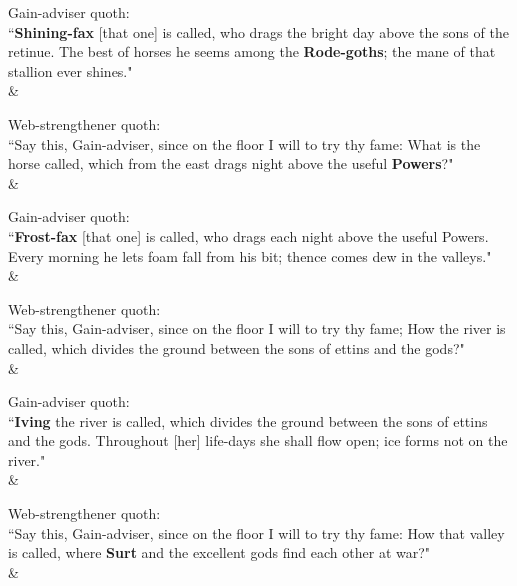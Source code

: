 \begin{Rightside}
\begin{astanza}%
\bv Gain-adviser quoth: \\ “\textbf{Shining-fax} [that one] is called, who drags the bright day above the sons of the retinue. The best of horses he seems among the \textbf{Rode-goths}; the mane of that stallion ever shines." \\
\&\end{astanza}%

\begin{astanza}%
\bv Web-strengthener quoth: \\ “Say this, Gain-adviser, since on the floor I will to try thy fame: What is the horse called, which from the east drags night above the useful \textbf{Powers}?" \\
\&\end{astanza}%

\begin{astanza}%
\bv Gain-adviser quoth: \\ “\textbf{Frost-fax} [that one] is called, who drags each night above the useful Powers. Every morning he lets foam fall from his bit\footnotemark[26]; thence comes dew in the valleys." \\
\&\end{astanza}%

\begin{astanza}%
\bv Web-strengthener quoth: \\ “Say this, Gain-adviser, since on the floor I will to try thy fame; How the river is called, which divides the ground between the sons of ettins and the gods?" \\
\&\end{astanza}%

\begin{astanza}%
\bv Gain-adviser quoth: \\ “\textbf{Iving} the river is called, which divides the ground between the sons of ettins and the gods. Throughout [her] life-days she shall flow open; ice forms not on the river." \\
\&\end{astanza}%

\begin{astanza}%
\bv Web-strengthener quoth: \\ “Say this, Gain-adviser, since on the floor I will to try thy fame: How that valley is called, where \textbf{Surt} and the excellent gods find each other at war?" \\
\&\end{astanza}%


\end{Rightside}
